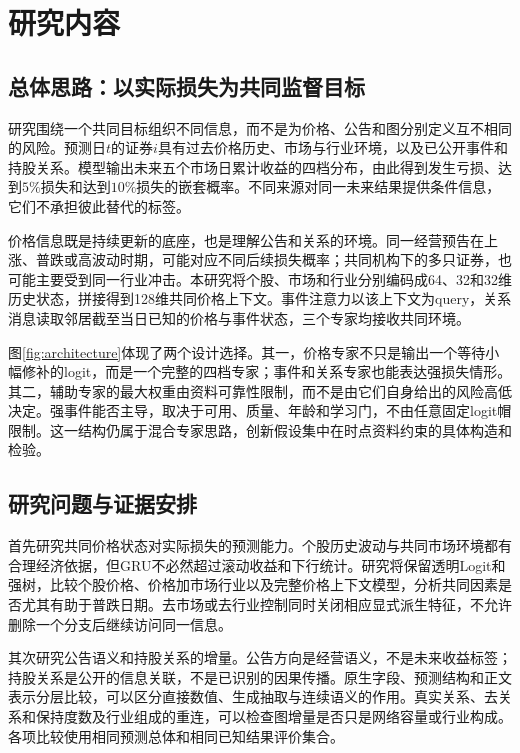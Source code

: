 \chapter{研究内容}
\section{总体思路：以实际损失为共同监督目标}
研究围绕一个共同目标组织不同信息，而不是为价格、公告和图分别定义互不相同的风险。预测日$t$的证券$i$具有过去价格历史、市场与行业环境，以及已公开事件和持股关系。模型输出未来五个市场日累计收益的四档分布，由此得到发生亏损、达到$5\%$损失和达到$10\%$损失的嵌套概率。不同来源对同一未来结果提供条件信息，它们不承担彼此替代的标签。

价格信息既是持续更新的底座，也是理解公告和关系的环境。同一经营预告在上涨、普跌或高波动时期，可能对应不同后续损失概率；共同机构下的多只证券，也可能主要受到同一行业冲击。本研究将个股、市场和行业分别编码成64、32和32维历史状态，拼接得到128维共同价格上下文。事件注意力以该上下文为query，关系消息读取邻居截至当日已知的价格与事件状态，三个专家均接收共同环境。


图\ref{fig:architecture}体现了两个设计选择。其一，价格专家不只是输出一个等待小幅修补的logit，而是一个完整的四档专家；事件和关系专家也能表达强损失情形。其二，辅助专家的最大权重由资料可靠性限制，而不是由它们自身给出的风险高低决定。强事件能否主导，取决于可用、质量、年龄和学习门，不由任意固定logit帽限制。这一结构仍属于混合专家思路，创新假设集中在时点资料约束的具体构造和检验。

\section{研究问题与证据安排}
首先研究共同价格状态对实际损失的预测能力。个股历史波动与共同市场环境都有合理经济依据，但GRU不必然超过滚动收益和下行统计。研究将保留透明Logit和强树，比较个股价格、价格加市场行业以及完整价格上下文模型，分析共同因素是否尤其有助于普跌日期。去市场或去行业控制同时关闭相应显式派生特征，不允许删除一个分支后继续访问同一信息。

其次研究公告语义和持股关系的增量。公告方向是经营语义，不是未来收益标签；持股关系是公开的信息关联，不是已识别的因果传播。原生字段、预测结构和正文表示分层比较，可以区分直接数值、生成抽取与连续语义的作用。真实关系、去关系和保持度数及行业组成的重连，可以检查图增量是否只是网络容量或行业构成。各项比较使用相同预测总体和相同已知结果评价集合。

